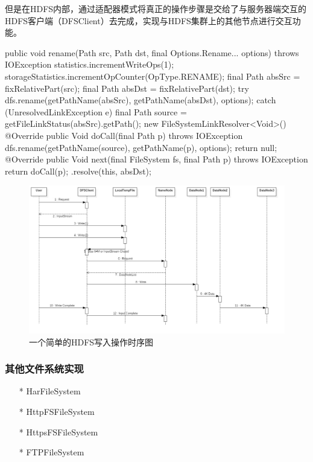         但是在HDFS内部，通过适配器模式将真正的操作步骤是交给了与服务器端交互的HDFS客户端（DFSClient）去完成，实现与HDFS集群上的其他节点进行交互功能。
        \begin{java}[caption=DistributedFileSystem.rename]
public void rename(Path src, Path dst, final Options.Rename... options) throws IOException {
    statistics.incrementWriteOps(1);
    storageStatistics.incrementOpCounter(OpType.RENAME);
    final Path absSrc = fixRelativePart(src);
    final Path absDst = fixRelativePart(dst);
    try {
        dfs.rename(getPathName(absSrc), getPathName(absDst), options);
    } catch (UnresolvedLinkException e) {
        final Path source = getFileLinkStatus(absSrc).getPath();
        new FileSystemLinkResolver<Void>() {
            @Override
            public Void doCall(final Path p) throws IOException {
                dfs.rename(getPathName(source), getPathName(p), options);
                return null;
            }
            @Override
            public Void next(final FileSystem fs, final Path p) throws IOException {
                return doCall(p);
            }
        }.resolve(this, absDst);
    }
}
        \end{java}
        \begin{figure}[h]
            \centering
            \includegraphics[width=1\linewidth]{HDFSInputTime}
            \caption{一个简单的HDFS写入操作时序图}
            \label{fig:HDFS Input Time}
        \end{figure}


    \subsubsection{其他文件系统实现}
        \begin{itemize}
            \item[*] HarFileSystem
            \item[*] HttpFSFileSystem
            \item[*] HttpsFSFileSystem
            \item[*] FTPFileSystem
        \end{itemize}


\endinput